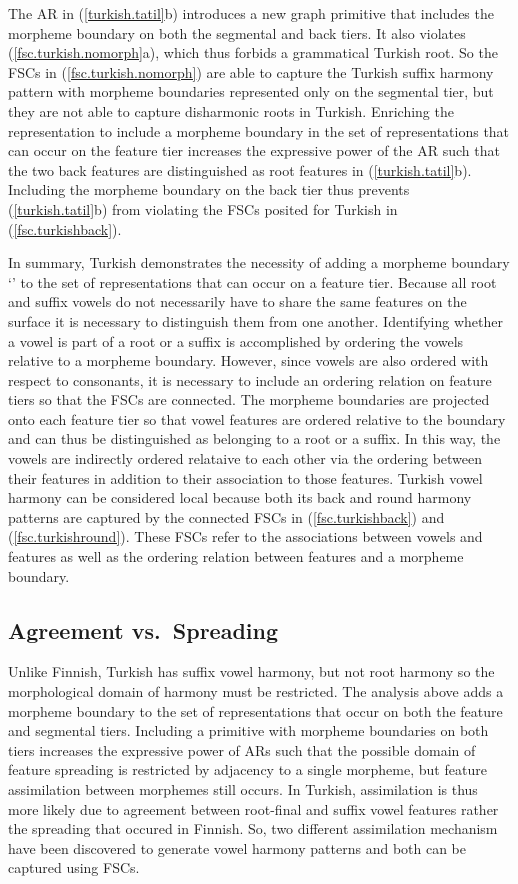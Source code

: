 \documentclass[,doc,floatsintext]{apa6}
\theoremstyle{definition}
\theoremstyle{definition}
\theoremstyle{definition}
\theoremstyle{remark}
\begin{document}
The AR in (\ref{turkish.tatil}b) introduces a new graph primitive that
includes the morpheme boundary on both the segmental and back tiers. It
also violates (\ref{fsc.turkish.nomorph}a), which thus forbids a
grammatical Turkish root. So the FSCs in (\ref{fsc.turkish.nomorph}) are
able to capture the Turkish suffix harmony pattern with morpheme
boundaries represented only on the segmental tier, but they are not able
to capture disharmonic roots in Turkish. Enriching the representation to
include a morpheme boundary in the set of representations that can occur
on the feature tier increases the expressive power of the AR such that
the two back features are distinguished as root features in
(\ref{turkish.tatil}b). Including the morpheme boundary on the back tier
thus prevents (\ref{turkish.tatil}b) from violating the FSCs posited for
Turkish in (\ref{fsc.turkishback}).

In summary, Turkish demonstrates the necessity of adding a morpheme
boundary `\textipa{\LARGE+}' to the set of representations that can
occur on a feature tier. Because all root and suffix vowels do not
necessarily have to share the same features on the surface it is
necessary to distinguish them from one another. Identifying whether a
vowel is part of a root or a suffix is accomplished by ordering the
vowels relative to a morpheme boundary. However, since vowels are also
ordered with respect to consonants, it is necessary to include an
ordering relation on feature tiers so that the FSCs are connected. The
morpheme boundaries are projected onto each feature tier so that vowel
features are ordered relative to the boundary and can thus be
distinguished as belonging to a root or a suffix. In this way, the
vowels are indirectly ordered relataive to each other via the ordering
between their features in addition to their association to those
features. Turkish vowel harmony can be considered local because both its
back and round harmony patterns are captured by the connected FSCs in
(\ref{fsc.turkishback}) and (\ref{fsc.turkishround}). These FSCs refer
to the associations between vowels and features as well as the ordering
relation between features and a morpheme boundary.

\subsection{Agreement vs.~Spreading}\label{agreement-vs.spreading}

Unlike Finnish, Turkish has suffix vowel harmony, but not root harmony
so the morphological domain of harmony must be restricted. The analysis
above adds a morpheme boundary to the set of representations that occur
on both the feature and segmental tiers. Including a primitive with
morpheme boundaries on both tiers increases the expressive power of ARs
such that the possible domain of feature spreading is restricted by
adjacency to a single morpheme, but feature assimilation between
morphemes still occurs. In Turkish, assimilation is thus more likely due
to agreement between root-final and suffix vowel features rather the
spreading that occured in Finnish. So, two different assimilation
mechanism have been discovered to generate vowel harmony patterns and
both can be captured using FSCs.
\end{document}
